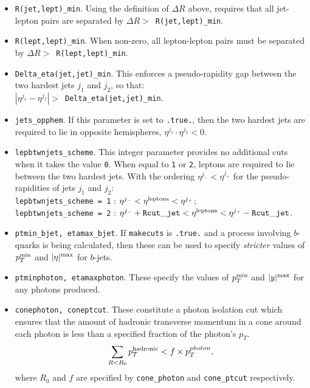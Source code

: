 \documentclass[12pt]{article}
\begin{document}
\begin{itemize}
\item {\tt R(jet,lept)\_min}. Using the definition of $\Delta R$ above,
requires that all jet-lepton pairs are separated by
$\Delta R >$~{\tt R(jet,lept)\_min}.

\item {\tt R(lept,lept)\_min}. When non-zero, all lepton-lepton pairs
must be separated by $\Delta R >$~{\tt R(lept,lept)\_min}.

\item {\tt Delta\_eta(jet,jet)\_min}. This enforces a pseudo-rapidity
gap between the two hardest jets $j_1$ and $j_2$, so that: \\
$|\eta^{j_1} - \eta^{j_2}| >$~{\tt Delta\_eta(jet,jet)\_min}.

\item {\tt jets\_opphem}. If this parameter is set to {\tt .true.},
then the two hardest jets are required to lie in opposite hemispheres,
$\eta^{j_1} \cdot \eta^{j_2} < 0$.

\item {\tt lepbtwnjets\_scheme}. This integer parameter provides no
additional cuts when it takes the value {\tt 0}. When equal to
{\tt 1} or {\tt 2}, leptons are required to lie between the two
hardest jets. With the ordering $\eta^{j_-} < \eta^{j_+}$ for the
pseudo-rapidities of jets $j_1$ and $j_2$: \\
{\tt lepbtwnjets\_scheme = 1} : 
 $\eta^{j_-} < \eta^{\rm leptons} < \eta^{j_+}$; \\
{\tt lepbtwnjets\_scheme = 2} :
 $\eta^{j_-}+{\tt Rcut\_jet} < \eta^{\rm leptons} < \eta^{j_+}-{\tt Rcut\_jet}$.

\item {\tt ptmin\_bjet,  etamax\_bjet}. If {\tt makecuts} is {\tt .true.}
and a process involving $b$-quarks is being calculated, then these can
be used to specify {\em stricter} values of $p_T^{\rm min}$
and $|\eta|^{\rm max}$ for $b$-jets.

\item {\tt ptminphoton, etamaxphoton}. These specify the values
of $p_T^{\rm min}$ and $|y|^{\rm max}$ for any photons produced.

\item {\tt conephoton, coneptcut}. These constitute a photon isolation
cut which ensures that the amount of hadronic
transverse momentum in a cone around each photon is less than
a specified fraction of the photon's $p_T$.
\begin{displaymath}
\sum_{R < R_0} p_T^{\rm hadronic} < f \times p_T^{photon},
\end{displaymath}
where $R_0$ and $f$ are specified by {\tt cone\_photon} and
{\tt cone\_ptcut} respectively.


\end{itemize}
\end{document}
